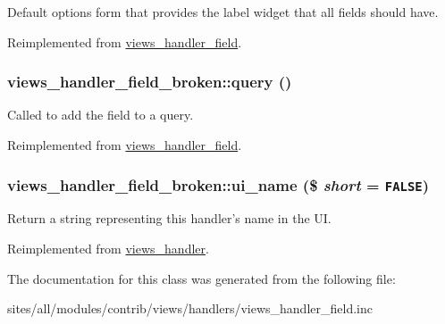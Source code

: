 Default options form that provides the label widget that all fields should have. 

Reimplemented from \hyperlink{classviews__handler__field_0435d161922b7b4b84f02a2e79bb947a}{views\_\-handler\_\-field}.\hypertarget{classviews__handler__field__broken_f6665205257b9b0e1dce732645f5dde1}{
\subsubsection[{query}]{\setlength{\rightskip}{0pt plus 5cm}views\_\-handler\_\-field\_\-broken::query ()}}
\label{classviews__handler__field__broken_f6665205257b9b0e1dce732645f5dde1}


Called to add the field to a query. 

Reimplemented from \hyperlink{classviews__handler__field_4f661f91bcbe80d4a00c30a31456c502}{views\_\-handler\_\-field}.\hypertarget{classviews__handler__field__broken_0b3272926656e5fc3f6c011fa51746ed}{
\subsubsection[{ui\_\-name}]{\setlength{\rightskip}{0pt plus 5cm}views\_\-handler\_\-field\_\-broken::ui\_\-name (\$ {\em short} = {\tt FALSE})}}
\label{classviews__handler__field__broken_0b3272926656e5fc3f6c011fa51746ed}


Return a string representing this handler's name in the UI. 

Reimplemented from \hyperlink{classviews__handler_e81019ed08d9c3f5bca3d16c69e7b39f}{views\_\-handler}.

The documentation for this class was generated from the following file:\begin{CompactItemize}
\item 
sites/all/modules/contrib/views/handlers/views\_\-handler\_\-field.inc\end{CompactItemize}
